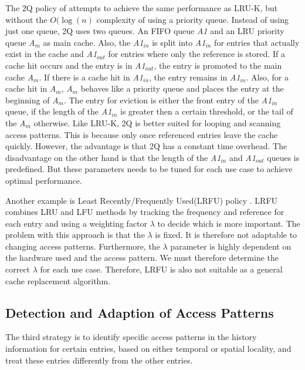 \documentclass[
	12pt,
	a4paper,
	abstract,
	bibliography=totoc,
	chapterprefix,
	headings=openright,
	numbers=endperiod,
	parskip=half,
	twoside,
]{scrreprt}
\begin{document}
The 2Q policy of \cite{shasha19942q} attempts to achieve the same performance as LRU-K, but without the $O(\log(n)$ complexity of using a priority queue.
Instead of using just one queue, 2Q uses two queues.
An FIFO queue \emph{A1} and an LRU priority queue \emph{A$_m$} as main cache.
Also, the \emph{A1$_{in}$} is split into \emph{A1$_{in}$} for entries that actually exist in the cache and \emph{A1$_{out}$} for entries where only the reference is stored.
If a cache hit occurs and the entry is in \emph{A1$_{out}$}, the entry is promoted to the main cache \emph{A$_m$}.
If there is a cache hit in \emph{A1$_{in}$}, the entry remains in \emph{A1$_{in}$}.
Also, for a cache hit in \emph{A$_m$}, \emph{A$_m$} behaves like a priority queue and places the entry at the beginning of \emph{A$_m$}.
The entry for eviction is either the front entry of the \emph{A1$_{in}$} queue, if the length of the \emph{A1$_{in}$} is greater then a certain threshold, or the tail of the 
\emph{A$_m$} otherwise.
Like LRU-K, 2Q is better suited for looping and scanning access patterns.
This is because only once referenced entries leave the cache quickly.
However, the advantage is that 2Q has a constant time overhead.
The disadvantage on the other hand is that the 
length of the \emph{A1$_{in}$} and \emph{A1$_{out}$} queues is predefined.
But these parameters needs to be tuned for each use case to achieve optimal performance.

Another example is Least Recently/Frequently Used(LRFU) policy \cite{lee2001lrfu}.
LRFU combines LRU and LFU methods by tracking the frequency and reference for each entry and using a weighting factor $\lambda$ to decide which is more important.
The problem with this approach is that the $\lambda$ is fixed.
It is therefore not adaptable to changing access patterns.
Furthermore, the $\lambda$ parameter is highly dependent on the hardware used and the access pattern.
We must therefore determine the correct $\lambda$ for each use case.
Therefore, LRFU is also not suitable as a general cache replacement algorithm.

\subsection{Detection and Adaption of Access Patterns}

The third strategy is to identify specific access patterns in the history information for certain entries, based on either temporal or spatial locality, and treat these entries differently from the other entries.
\end{document}
